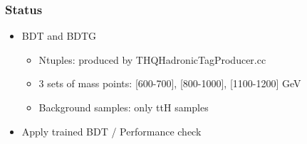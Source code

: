 \begin{frame}
\frametitle{Status}
\begin{itemize}
\item BDT and BDTG
    \begin{footnotesize}
    \begin{itemize}
    \item Ntuples: produced by THQHadronicTagProducer.cc
    \item 3 sets of mass points: [600-700], [800-1000], [1100-1200] GeV
    \item Background samples: only ttH samples 
    \end{itemize}
    \end{footnotesize}
\item Apply trained BDT / Performance check
\end{itemize}
\end{frame}

